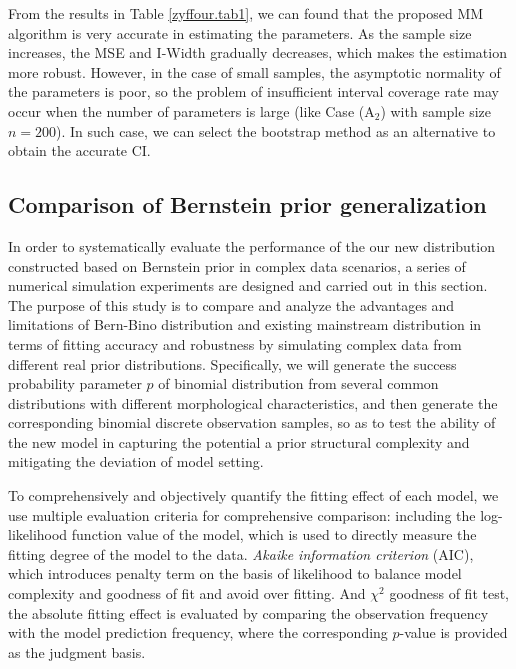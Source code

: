 \vkL From the results in Table \ref{zyffour.tab1}, we can found that the proposed MM algorithm is very accurate in estimating the parameters. As the sample size increases, the \textsf{MSE} and \textsf{I-Width} gradually decreases, which makes the estimation more robust. However, in the case of small samples, the asymptotic normality of the parameters is poor, so the problem of insufficient interval coverage rate may occur when the number of parameters is large (like Case ($\mbox{A}_2$) with sample size $n=200$). In such case, we can select the bootstrap method as an alternative to obtain the accurate CI.


\subsection{Comparison of Bernstein prior generalization}     %

In order to systematically evaluate the performance of the our new distribution constructed based on Bernstein prior in complex data scenarios, a series of numerical simulation experiments are designed and carried out in this section. The purpose of this study is to compare and analyze the advantages and limitations of Bern-Bino distribution and existing mainstream distribution in terms of fitting accuracy and robustness by simulating complex data from different real prior distributions. Specifically, we will generate the success probability parameter $p$ of binomial distribution from several common distributions with different morphological characteristics, and then generate the corresponding binomial discrete observation samples, so as to test the ability of the new model in capturing the potential a prior structural complexity and mitigating the deviation of model setting.

To comprehensively and objectively quantify the fitting effect of each model, we use multiple evaluation criteria for comprehensive comparison: including the log-likelihood function value of the model, which is used to directly measure the fitting degree of the model to the data. \textit{Akaike information criterion} (AIC), which introduces penalty term on the basis of likelihood to balance model complexity and goodness of fit and avoid over fitting. And $\chi^2$ goodness of fit test, the absolute fitting effect is evaluated by comparing the observation frequency with the model prediction frequency, where the corresponding $p$-value is provided as the judgment basis.

